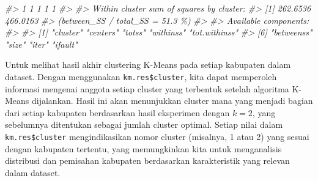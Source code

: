 \documentclass[
  oneside]{book}
\newenvironment{Shaded}{\begin{snugshade}}{\end{snugshade}}
\newcommand{\CommentTok}[1]{\textcolor[rgb]{0.56,0.35,0.01}{\textit{#1}}}
\begin{document}
\begin{Shaded}
\begin{Highlighting}[]
\CommentTok{\#\textgreater{}               1               1               1               1               1 }
\CommentTok{\#\textgreater{} }
\CommentTok{\#\textgreater{} Within cluster sum of squares by cluster:}
\CommentTok{\#\textgreater{} [1] 262.6536 466.0163}
\CommentTok{\#\textgreater{}  (between\_SS / total\_SS =  51.3 \%)}
\CommentTok{\#\textgreater{} }
\CommentTok{\#\textgreater{} Available components:}
\CommentTok{\#\textgreater{} }
\CommentTok{\#\textgreater{} [1] "cluster"      "centers"      "totss"        "withinss"     "tot.withinss"}
\CommentTok{\#\textgreater{} [6] "betweenss"    "size"         "iter"         "ifault"}
\end{Highlighting}
\end{Shaded}

Untuk melihat hasil akhir clustering K-Means pada setiap kabupaten dalam dataset. Dengan menggunakan \texttt{km.res\$cluster}, kita dapat memperoleh informasi mengenai anggota setiap cluster yang terbentuk setelah algoritma K-Means dijalankan. Hasil ini akan menunjukkan cluster mana yang menjadi bagian dari setiap kabupaten berdasarkan hasil eksperimen dengan \(k=2\), yang sebelumnya ditentukan sebagai jumlah cluster optimal. Setiap nilai dalam \texttt{km.res\$cluster} mengindikasikan nomor cluster (misalnya, 1 atau 2) yang sesuai dengan kabupaten tertentu, yang memungkinkan kita untuk menganalisis distribusi dan pemisahan kabupaten berdasarkan karakteristik yang relevan dalam dataset.
\end{document}
